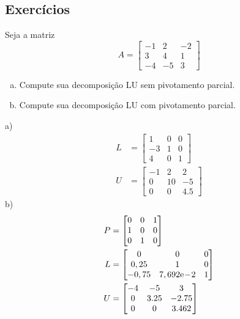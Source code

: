 \subsection*{Exercícios}

\begin{exer}
  Seja a matriz
  \begin{equation}
    A =
    \begin{bmatrix}
      -1 & 2 & -2\\
      3 & 4 & 1\\
      -4 & -5 & 3
    \end{bmatrix}
  \end{equation}
  \begin{enumerate}[a)]
  \item Compute sua decomposição LU sem pivotamento parcial.
  \item Compute sua decomposição LU com pivotamento parcial.
  \end{enumerate}
\end{exer}
\begin{resp}
  a)
  \begin{align}
    L &=
        \begin{bmatrix}
          1 & 0 & 0\\
          -3 & 1 & 0\\
          4 & 0 & 1
        \end{bmatrix}\\
    U &=
        \begin{bmatrix}
          -1 & 2 & 2\\
          0 & 10 & -5\\
          0 & 0 & 4.5
        \end{bmatrix}
  \end{align}
  b)
  \begin{align}
    P &=
        \begin{bmatrix}
          0 & 0 & 1\\
          1 & 0 & 0\\
          0 & 1 & 0
        \end{bmatrix}\\
    L &=
        \begin{bmatrix}
              0  & 0 & 0\\
           0,25  & 1 & 0\\
          -0,75  & 7,692\mathrm{e}\!-\!2 & 1
        \end{bmatrix}\\
    U &=
        \begin{bmatrix}
          -4 & -5 & 3\\
          0 & 3.25 & -2.75\\
          0 & 0 & 3.462
        \end{bmatrix}
  \end{align}  
\end{resp}


